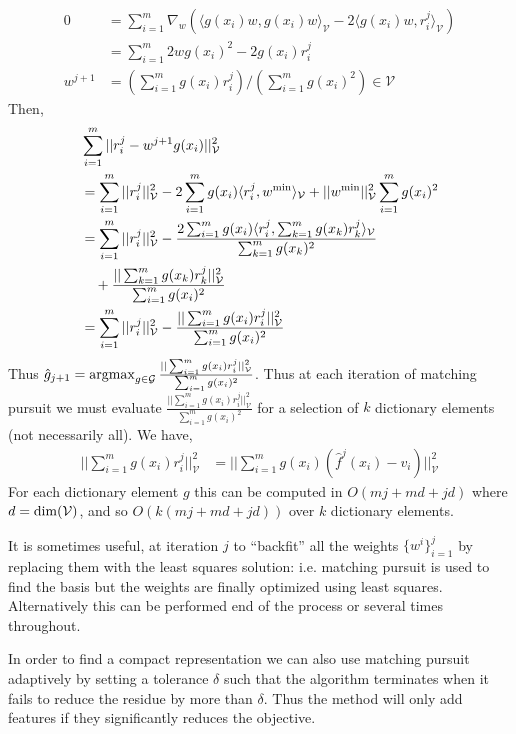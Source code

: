 \documentclass[letterpaper]{article}
\newcommand{\cV}{{\mathcal V}}
\newcommand{\cG}{{\mathcal G}}
\newcommand{\argmax}{\operatornamewithlimits{argmax}}
\newcommand{\lang}{\langle}
\newcommand{\rang}{\rangle}
\newcommand{\nn}{\nonumber}
\begin{document}
\begin{align}
0 &= \sum_{i=1}^m  \nabla_w \left(  \lang  g(x_i)w,g(x_i)w  \rang_{\cV} -2\lang g(x_i) w, r^j_i \rang_\cV \right)  \nn\\
&=  \sum_{i=1}^m 2w g(x_i)^2 -2 g(x_i)  r^j_i  \nn\\
w^{j+1} &=  \left(\sum_{i=1}^m  g(x_i)  r^j_i \right) /\left( \sum_{i=1}^m  g(x_i)^2 \right) \in\cV \nn
\end{align}
Then,
\begin{align}
&\sum_{i=1}^m ||r^j_i -  w^{j+1} g(x_i)  ||_{\cV}^2 \nn\\
&=  \sum_{i=1}^m ||r^j_i||_\cV^2 - 2\sum_{i=1}^m g(x_i)\lang  r^j_i,w^{\rm min} \rang_\cV + ||w^{\rm min}||_\cV^2 \sum_{i=1}^m  g(x_i)^2 \nn\\
&= \sum_{i=1}^m ||r^j_i||_\cV^2 - \frac{2\sum_{i=1}^m g(x_i)\lang  r^j_i, \sum_{k=1}^m  g(x_k)  r^j_k   \rang_\cV}{ \sum_{k=1}^m  g(x_k)^2} \\
&\quad + \frac{ ||\sum_{k=1}^m  g(x_k)  r^j_k  ||_\cV^2 }{ \sum_{i=1}^m  g(x_i)^2 }\nn\\
&= \sum_{i=1}^m ||r^j_i||_\cV^2 - \frac{ ||\sum_{i=1}^m  g(x_i)  r^j_i  ||_\cV^2 }{ \sum_{i=1}^m  g(x_i)^2 }\nn
\end{align}
Thus $\hat g_{j+1} = \argmax_{g\in\cG}  \frac{ ||\sum_{i=1}^m  g(x_i)  r^j_i  ||_\cV^2 }{ \sum_{i=1}^m  g(x_i)^2 }$. Thus at each iteration of matching pursuit we must evaluate $\frac{ ||\sum_{i=1}^m  g(x_i)  r^j_i  ||_\cV^2 }{ \sum_{i=1}^m  g(x_i)^2 }$ for a selection of $k$ dictionary elements (not necessarily all). We have,
\begin{align}
 ||\sum_{i=1}^m  g(x_i)  r^j_i  ||_\cV^2  &=  ||\sum_{i=1}^m  g(x_i) (\hat f^j(x_i) - v_i)  ||_\cV^2 \nn
\end{align}
For each dictionary element $g$ this can be computed in $O(mj+md+jd)$ where $d={\rm dim}(\cV)$, and so $O(k(mj+md+jd))$ over $k$ dictionary elements.

It is sometimes useful, at iteration $j$ to ``backfit'' all the weights $\{w^i\}_{i=1}^j$ by replacing them with the least squares solution: i.e. matching pursuit is used to find the basis but the weights are finally optimized using least squares. Alternatively this can be performed end of the process or several times throughout.

In order to find a compact representation we can also use matching pursuit adaptively by setting a tolerance $\delta$ such that the algorithm terminates when it fails to reduce the residue by more than $\delta$. Thus the method will only add features if they significantly reduces the objective.
\end{document}
